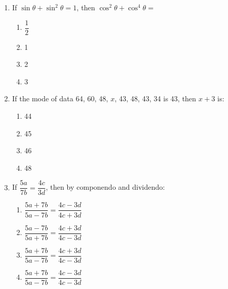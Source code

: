 \begin{enumerate}[label=(\roman*)]
    \item If $\sin \theta + \sin^2 \theta = 1$, then $\cos^2 \theta + \cos^4 \theta = $

        \begin{multicols}{2}
        \begin{enumerate}[label=(\alph*)]
            \item $\dfrac12$ 
            \item 1
            \item 2
            \item 3
        \end{enumerate}
        \end{multicols}

    \item If the mode of data 64, 60, 48, $x$, 43, 48, 43, 34 is 43, then $x+3$ is: 

        \begin{multicols}{2}
        \begin{enumerate}[label=(\alph*)]
            \item 44 
            \item 45 
            \item 46 
            \item 48 
        \end{enumerate}
        \end{multicols}

    \item If $\dfrac{5a}{7b} = \dfrac{4c}{3d}$, then by componendo and 
        dividendo:

        \begin{multicols}{2}
        \begin{enumerate}[label=(\alph*)]
            \item $\dfrac{5a + 7b}{5a - 7b} = \dfrac{4c - 3d}{4c + 3d}$ 
            \item $\dfrac{5a - 7b}{5a + 7b} = \dfrac{4c + 3d}{4c - 3d}$ 
            \item $\dfrac{5a + 7b}{5a - 7b} = \dfrac{4c + 3d}{4c - 3d}$ 
            \item $\dfrac{5a + 7b}{5a - 7b} = \dfrac{4c - 3d}{4c - 3d}$ 
        \end{enumerate}
        \end{multicols}


\end{enumerate}
